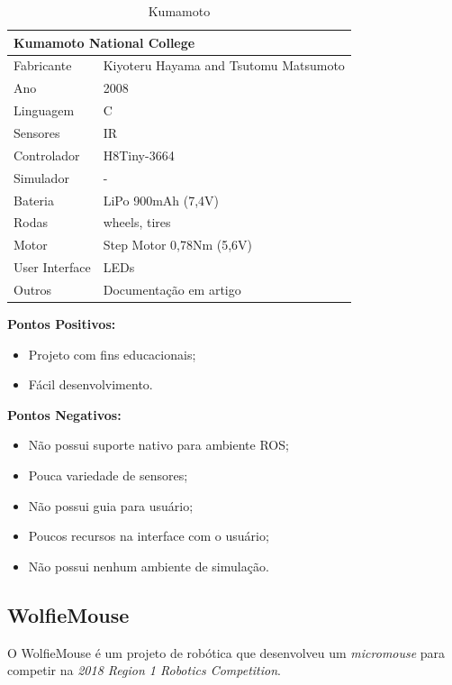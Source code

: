 \begin{table}[H]
	\centering
	\begin{tabular}{|l|l|}
		\hline
		\multicolumn{2}{|l|}{\textbf{Kumamoto National College}} \\ \hline
		Fabricante & Kiyoteru Hayama and Tsutomu Matsumoto \\ \hline
		Ano & 2008 \\ \hline
		Linguagem & C \\ \hline
		Sensores & IR \\ \hline
		Controlador & H8Tiny-3664 \\ \hline
		Simulador & - \\ \hline
		Bateria & LiPo 900mAh (7,4V) \\ \hline
		Rodas & wheels, tires \\ \hline
		Motor & Step Motor 0,78Nm (5,6V) \\ \hline
		User Interface & LEDs \\ \hline
		Outros & Documentação em artigo \\ \hline
	\end{tabular}
	\caption{\label{tab:Kumamoto} Kumamoto}
\end{table}



\textbf{Pontos Positivos:}
\begin{itemize}
	\item Projeto com fins educacionais;
	\item Fácil desenvolvimento.
\end{itemize}

\textbf{Pontos Negativos:}
\begin{itemize}
	\item Não possui suporte nativo para ambiente ROS;
	\item Pouca variedade de sensores;
	\item Não possui guia para usuário;
	\item Poucos recursos na interface com o usuário;
	\item Não possui nenhum ambiente de simulação.
\end{itemize}


\subsection{WolfieMouse}
\hspace{0.5cm} O WolfieMouse é um projeto de robótica que desenvolveu um \textit{micromouse} para competir na \textit{2018 Region 1 Robotics Competition}.

